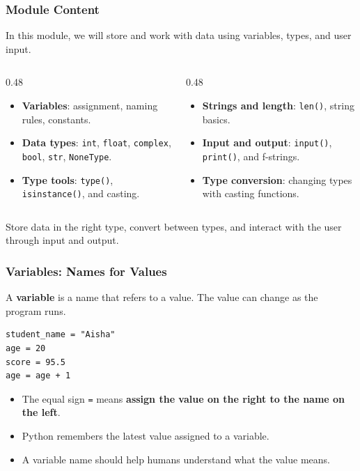 \documentclass[aspectratio=169,10pt]{beamer}
\newcommand{\keyword}[1]{\textcolor{PrimaryBlue}{\textbf{#1}}}
\newcommand{\myitem}[1]{\item #1\vspace{0.04cm}}
\begin{document}
\begin{frame}[fragile]
\frametitle{Module Content}
\small
In this module, we will store and work with data using variables, types, and user input.

\vspace{0.18cm}
\begin{columns}[T,totalwidth=0.96\textwidth]
\begin{column}{0.48\textwidth}
\begin{itemize}\setlength\itemsep{0.05cm}
  \item \keyword{Variables}: assignment, naming rules, constants.
  \item \keyword{Data types}: \texttt{int}, \texttt{float}, \texttt{complex}, \texttt{bool}, \texttt{str}, \texttt{NoneType}.
  \item \keyword{Type tools}: \texttt{type()}, \texttt{isinstance()}, and casting.
\end{itemize}
\end{column}
\begin{column}{0.48\textwidth}
\begin{itemize}\setlength\itemsep{0.05cm}
  \item \keyword{Strings and length}: \texttt{len()}, string basics.
  \item \keyword{Input and output}: \texttt{input()}, \texttt{print()}, and f-strings.
  \item \keyword{Type conversion}: changing types with casting functions.
\end{itemize}
\end{column}
\end{columns}
\vspace{0.10cm}
\begin{tcolorbox}[lecturebox,title=Learning goal]
Store data in the right type, convert between types, and interact with the user through input and output.
\end{tcolorbox}
\end{frame}


\begin{frame}[fragile]
\frametitle{Variables: Names for Values}
\begin{tcolorbox}[lecturebox,title=Key idea]
A \keyword{variable} is a name that refers to a value. The value can change as the program runs.
\end{tcolorbox}

\vspace{0.15cm}
\begin{lstlisting}[style=pycode]
student_name = "Aisha"
age = 20
score = 95.5
age = age + 1
\end{lstlisting}

\vspace{0.1cm}
\begin{itemize}
  \myitem{The equal sign \texttt{=} means \keyword{assign the value on the right to the name on the left}.}
  \myitem{Python remembers the latest value assigned to a variable.}
  \myitem{A variable name should help humans understand what the value means.}
\end{itemize}
\end{frame}
\end{document}
